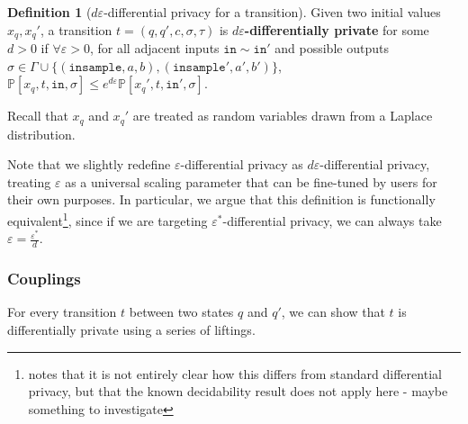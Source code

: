 \documentclass[12pt]{article}
\newcommand{\PP}{\mathbb{P}}
\theoremstyle{definition}
\newtheorem{defn}[thm]{Definition}
\begin{document}
\begin{defn}[$d\varepsilon$-differential privacy for a transition]
    Given two initial values $x_q, x_q'$, a transition $t=(q, q', c, \sigma, \tau)$ is \textbf{$d\varepsilon$-differentially private} for some $d>0$ if $\forall \varepsilon> 0$, for all adjacent inputs $\texttt{in}\sim \texttt{in}'$ and possible outputs $\sigma\in \Gamma\cup\{(\texttt{insample}, a, b), (\texttt{insample}', a', b')\}$, $\PP[x_q, t, \texttt{in}, \sigma]\leq e^{d\varepsilon}\PP[x_q', t, \texttt{in}', \sigma]$. 

    Recall that $x_q$ and $x_q'$ are treated as random variables drawn from a Laplace distribution. 
\end{defn}

Note that we slightly redefine $\varepsilon$-differential privacy as $d\varepsilon$-differential privacy, treating $\varepsilon$ as a universal scaling parameter that can be fine-tuned by users for their own purposes. 
In particular, we argue that this definition is functionally equivalent\footnote{\cite{chadhaLinearTimeDecidability2021} notes that it is not entirely clear how this differs from standard differential privacy, but that the known decidability result does not apply here - {\color{red} maybe something to investigate}}, since if we are targeting $\varepsilon^*$-differential privacy, we can always take $\varepsilon = \frac{\varepsilon^*}{d}$.

\subsubsection{Couplings}

For every transition $t$ between two states $q$ and $q'$, we can show that $t$ is differentially private using a series of liftings. 
\end{document}
